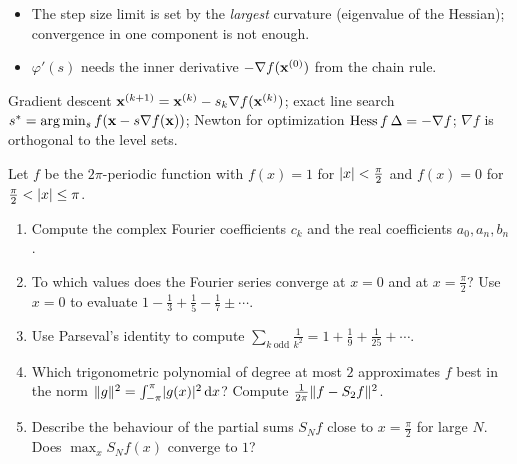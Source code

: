 \begin{solution}
\begin{trap}
\begin{itemize}
\item The step size limit is set by the \emph{largest} curvature (eigenvalue of the Hessian); convergence in one component is not enough.
\item $\varphi'(s)$ needs the inner derivative $-\nabla f(\mathbf{x}^{(0)})$ from the chain rule.
\end{itemize}
\end{trap}
\begin{heart}
Gradient descent $\mathbf{x}^{(k+1)}=\mathbf{x}^{(k)}-s_k\nabla f(\mathbf{x}^{(k)})$; exact line search $s^*=\arg\min_s f(\mathbf{x}-s\nabla f(\mathbf{x}))$; Newton for optimization $\operatorname{Hess} f\,\Delta=-\nabla f$; $\nabla f$ is orthogonal to the level sets.
\end{heart}
\end{solution}

Let $f$ be the $2\pi$-periodic function with $f(x)=1$ for $\lvert x\rvert<\frac\pi2$ and $f(x)=0$ for $\frac\pi2<\lvert x\rvert\le\pi$.
\begin{enumerate}
\item Compute the complex Fourier coefficients $c_k$ and the real coefficients $a_0,a_n,b_n$.
\item To which values does the Fourier series converge at $x=0$ and at $x=\frac\pi2$? Use $x=0$ to evaluate $1-\frac13+\frac15-\frac17\pm\cdots$.
\item Use Parseval's identity to compute $\sum_{k\ \mathrm{odd}}\frac1{k^2}=1+\frac1{9}+\frac1{25}+\cdots$.
\item Which trigonometric polynomial of degree at most $2$ approximates $f$ best in the norm $\lVert g\rVert^2=\int_{-\pi}^\pi\lvert g(x)\rvert^2\,\mathrm{d} x$? Compute $\frac1{2\pi}\lVert f-S_2f\rVert^2$.
\item Describe the behaviour of the partial sums $S_Nf$ close to $x=\frac\pi2$ for large $N$. Does $\max_xS_Nf(x)$ converge to $1$?
\end{enumerate}

